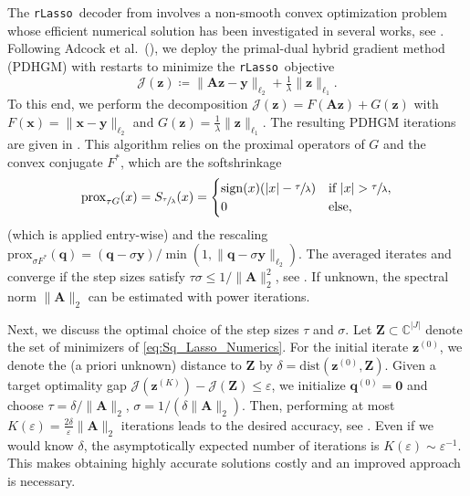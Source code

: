 \documentclass[11pt,reqno, a4paper]{article}
\numberwithin{equation}{section}
\newcommand{\rlasso}{\texttt{rLasso}}
\begin{document}
The \rlasso \ decoder from  involves a non-smooth convex optimization problem whose efficient numerical solution has been investigated in several works, see \cite{AdcCol2025,BeCheWa11,MayMelKra2024}.
Following Adcock et al.\ (\cite{AdcCol2025}), we deploy the primal-dual hybrid gradient method (PDHGM) \cite{ChaPoc2011} with restarts to minimize the \rlasso \ objective
\begin{equation}\label{eq:Sq_Lasso_Numerics}
		\mathcal J(\mathbf z) \coloneqq \lVert \mathbf{A} \mathbf{z} - {\mathbf{y}}\rVert_{\ell_2} + \tfrac{1}{\lambda} \lVert\mathbf{z}\rVert_{\ell_1}.
\end{equation}
To this end, we perform the decomposition $\mathcal J(\mathbf z) = F(\mathbf{A} \mathbf{z}) + G(\mathbf{z})$ with $F(\mathbf{x}) = \lVert \mathbf x - \mathbf y \rVert_{\ell_2}$ and $G(\mathbf{z}) = \frac{1}{\lambda}\lVert \mathbf{z} \rVert_{\ell_1}$.
The resulting PDHGM iterations are given in .
This algorithm relies on the proximal operators of $G$ and the convex conjugate $F^*$, which are the softshrinkage
\begin{equation}
    \mathrm{prox}_{\tau G}(x) = S_{\sfrac{\tau}{\lambda}}(x) = \begin{cases}
        \mathrm{sign}(x) (\vert x \vert - \sfrac{\tau}{\lambda}) & \text{if } \vert x \vert > \sfrac{\tau}{\lambda},\\
        0 & \text{else},
    \end{cases}
\end{equation}
(which is applied entry-wise) and the rescaling  $\mathrm{prox}_{\sigma F^*}(\mathbf q) = 
(\mathbf q - \sigma \mathbf y)/\min(1, \lVert \mathbf q - \sigma \mathbf y \rVert_{\ell_2})$.
The averaged iterates  and  converge if the step sizes satisfy $\tau \sigma \leq 1/ \lVert \mathbf{A} \rVert_{2}^2$, see \cite[Thm.\ 1]{ChaPoc2011}.
If unknown, the spectral norm $\lVert \mathbf{A} \rVert_{2}$ can be estimated with power iterations.

Next, we discuss the optimal choice of the step sizes $\tau$ and $\sigma$.
Let $\mathbf Z \subset \mathbb C^{\lvert J \rvert}$ denote the set of minimizers of \eqref{eq:Sq_Lasso_Numerics}.
For the initial iterate $\mathbf{z}^{(0)}$, we denote the (a priori unknown) distance to $\mathbf Z$ by $\delta = \mathrm{dist}(\mathbf{z}^{(0)},\mathbf Z)$.
Given a target optimality gap $\mathcal J(\mathbf{z}^{(K)}) - \mathcal J(\mathbf Z)\leq \varepsilon$, we initialize $\mathbf q^{(0)}= \mathbf 0$ and choose $\tau = \delta/\lVert \mathbf{A} \rVert_2$, $\sigma = 1/(\delta \lVert \mathbf{A} \rVert_2)$.
Then, performing at most $K(\varepsilon)=\frac{2\delta}{\varepsilon}\lVert \mathbf{A} \rVert_2$ iterations leads to the desired accuracy, see \cite[Prop.\ 4.12]{AdcCol2025}.
Even if we would know $\delta$, the asymptotically expected number of iterations is $K(\varepsilon) \sim \varepsilon^{-1}$.
This makes obtaining highly accurate solutions costly and an improved approach is necessary.
\end{document}
